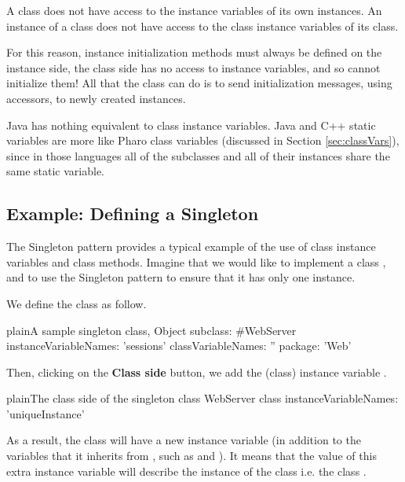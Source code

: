 \documentclass[10pt,twoside,english]{_support/latex/sbabook/sbabook}
\begin{document}
\begin{important}
A class does not have access to the instance variables of its own instances. An instance of a class does not have access to the class instance variables of its class.
\end{important}

For this reason, instance initialization methods must always be defined on the
instance side, the class side has no access to instance variables, and so cannot
initialize them! All that the class can do is to send initialization messages,
using accessors, to newly created instances.

Java has nothing equivalent to class instance variables. Java and C++ static
variables are more like Pharo class variables (discussed in
Section \ref{sec:classVars}), since in those languages all of the subclasses and
all of their instances share the same static variable.
\subsection{Example: Defining a Singleton}
The Singleton pattern provides a typical example of the use of class instance
variables and class methods. Imagine that we would like to implement a class
, and to use the Singleton pattern to ensure that it has only one
instance.

We define the class  as follow.

\begin{listing}[float]{plain}{A sample singleton class, }
Object subclass: #WebServer
    instanceVariableNames: 'sessions'
    classVariableNames: ''
    package: 'Web'
\end{listing}

Then, clicking on the \textbf{Class side} button, we add the (class) instance
variable .

\begin{listing}[float]{plain}{The class side of the singleton class}
WebServer class
    instanceVariableNames: 'uniqueInstance'
\end{listing}

As a result, the class  will have a new instance variable (in
addition to the variables that it inherits from , such as
 and ). It means that the value of this extra
instance variable will describe the instance of the class 
i.e. the class .
\end{document}
